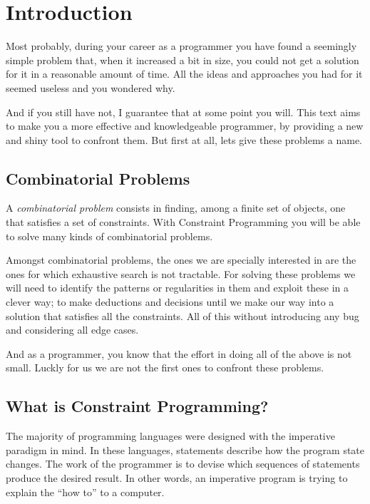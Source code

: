\section{Introduction}

Most probably, during your career as a programmer you have found
a seemingly simple problem that, when it increased a bit in size, you could not
get a solution for it in a reasonable amount of time. All the ideas and approaches
you had for it seemed useless and you wondered why.

And if you still have not, I guarantee that at some point you will.
This text aims to make you a more effective and knowledgeable programmer,
by providing a new and shiny tool to confront them. But first at all, lets give 
these problems a name.

\subsection{Combinatorial Problems}

A \emph{combinatorial problem} consists in finding, among a finite set of
objects, one that satisfies a set of constraints. With Constraint Programming
you will be able to solve many kinds of combinatorial problems. 

Amongst combinatorial problems, the ones we are specially interested in are the
ones for which exhaustive search is not tractable. For solving these problems
we will need to identify the patterns or regularities in them and exploit these
in a clever way; to make deductions and decisions until we make our way into a
solution that satisfies all the constraints. All of this without introducing any
bug and considering all edge cases.

And as a programmer, you know that the effort in doing all of the above is not
small. Luckly for us we are not the first ones to confront these problems.

\subsection{What is Constraint Programming?}

The majority of programming languages were designed with the imperative
paradigm in mind. In these languages, statements describe how the program state
changes.  The work of the programmer is to devise which sequences of statements
produce the desired result. In other words, an imperative program is trying to
explain the ``how to'' to a computer.


